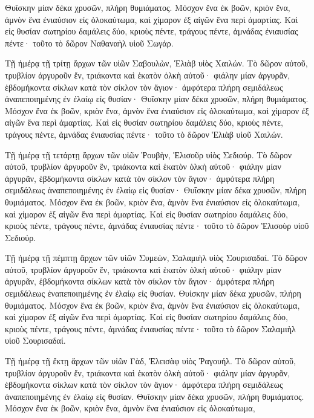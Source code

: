 {Θυΐσκην μίαν δέκα χρυσῶν, πλήρη θυμιάματος.
Μόσχον ἔνα ἐκ βοῶν, κριὸν ἕνα, ἀμνὸν ἕνα ἐνιαύσιον εἰς ὁλοκαύτωμα,
καὶ χίμαρον ἐξ αἰγῶν ἕνα περὶ ἁμαρτίας.
Καὶ εἰς θυσίαν σωτηρίου δαμάλεις δύο, κριοὺς πέντε, τράγους πέντε, ἀμνάδας ἐνιαυσίας πέντε· τοῦτο τὸ δῶρον Ναθαναὴλ υἱοῦ Σωγάρ.
\par }{\PP {}Τῇ ἡμέρᾳ τῇ τρίτῃ ἄρχων τῶν υἱῶν Σαβουλὼν, Ἑλιὰβ υἱὸς Χαιλών.
Τὸ δῶρον αὐτοῦ, τρυβλίον ἀργυροῦν ἕν, τριάκοντα καὶ ἑκατὸν ὁλκὴ αὐτοῦ· φιάλην μίαν ἀργυρᾶν, ἑβδομήκοντα σίκλων κατὰ τὸν σίκλον τὸν ἅγιον· ἀμφότερα πλήρη σεμιδάλεως ἀναπεποιημένης ἐν ἐλαίῳ εἰς θυσίαν·
Θυΐσκην μίαν δέκα χρυσῶν, πλήρη θυμιάματος.
Μόσχον ἕνα ἐκ βοῶν, κριὸν ἕνα, ἀμνὸν ἕνα ἐνιαύσιον εἰς ὁλοκαύτωμα,
καὶ χίμαρον ἐξ αἰγῶν ἕνα περὶ ἁμαρτίας.
Καὶ εἰς θυσίαν σωτηρίου δαμάλεις δύο, κριοὺς πέντε, τράγους πέντε, ἀμνάδας ἐνιαυσίας πέντε· τοῦτο τὸ δῶρον Ἑλιὰβ υἱοῦ Χαιλών.
\par }{\PP {}Τῇ ἡμέρᾳ τῇ τετάρτῃ ἄρχων τῶν υἱῶν Ῥουβὴν, Ἑλισοῦρ υἱὸς Σεδιούρ.
Τὸ δῶρον αὐτοῦ, τρυβλίον ἀργυροῦν ἓν, τριάκοντα καὶ ἑκατὸν ὁλκὴ αὐτοῦ· φιάλην μίαν ἀργυρᾶν, ἑβδομήκοντα σίκλων κατὰ τὸν σίκλον τὸν ἅγιον· ἀμφότερα πλήρη σεμιδάλεως ἀναπεποιημένης ἐν ἐλαίῳ εἰς θυσίαν·
Θυΐσκην μίαν δέκα χρυσῶν, πλήρη θυμιάματος.
Μόσχον ἕνα ἐκ βοῶν, κριὸν ἕνα, ἀμνὸν ἕνα ἐνιαύσιον εἰς ὁλοκαύτωμα,
καὶ χίμαρον ἐξ αἰγῶν ἕνα περὶ ἁμαρτίας.
Καὶ εἰς θυσίαν σωτηρίου δαμάλεις δύο, κριοὺς πέντε, τράγους πέντε, ἀμνάδας ἐνιαυσίας πέντε· τοῦτο τὸ δῶρον Ἑλισοὺρ υἱοῦ Σεδιούρ.
\par }{\PP {}Τῇ ἡμέρᾳ τῇ πέμπτῃ ἄρχων τῶν υἱῶν Συμεὼν, Σαλαμιὴλ υἱὸς Σουρισαδαί.
Τὸ δῶρον αὐτοῦ, τρυβλίον ἀργυροῦν ἓν, τριάκοντα καὶ ἑκατὸν ὁλκὴ αὐτοῦ· φιάλην μίαν ἀργυρᾶν, ἑβδομήκοντα σίκλων κατὰ τὸν σίκλον τὸν ἅγιον· ἀμφότερα πλήρη σεμιδάλεως ἐναπεποιημένης ἐν ἐλαίῳ εἰς θυσίαν.
Θυίσκην μίαν δέκα χρυσῶν, πλήρη θυμιάματος.
Μόσχον ἕνα ἐκ βοῶν, κριὸν ἕνα, ἀμνὸν ἕνα ἐνιαύσιον εἰς ὁλοκαύτωμα,
καὶ χίμαρον ἐξ αἰγῶν ἕνα περὶ ἁμαρτίας.
Καὶ εἰς θυσίαν σωτηρίου δαμάλεις δύο, κριοὺς πέντε, τράγους πέντε, ἀμνάδας ἐνιαυσίας πέντε· τοῦτο τὸ δῶρον Σαλαμιὴλ υἱοῦ Σουρισαδαί.
\par }{\PP {}Τῇ ἡμέρᾳ τῇ ἕκτῃ ἄρχων τῶν υἱῶν Γὰδ, Ἐλεισὰφ υἱὸς Ῥαγουήλ.
Τὸ δῶρον αὐτοῦ, τρυβλίον ἀργυροῦν ἕν, τριάκοντα καὶ ἑκατὸν ὁλκὴ αὐτοῦ· φιάλην μίαν ἀργυρᾶν, ἑβδομήκοντα σίκλων κατὰ τὸν σίκλον τὸν ἅγιον· ἀμφότερα πλήρη σεμιδάλεως ἀναπεποιημένης ἐν ἐλαίῳ εἰς θυσίαν.
Θυΐσκην μίαν δέκα χρυσῶν, πλήρη θυμιάματος.
Μόσχον ἕνα ἐκ βοῶν, κριὸν ἕνα, ἀμνὸν ἕνα ἐνιαύσιον εἰς ὁλοκαύτωμα,
}
